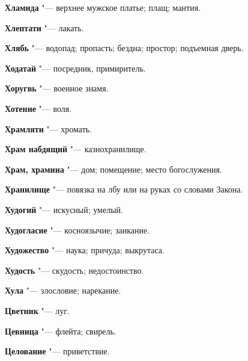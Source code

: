 \begin{mymulticols}{2}
\noindent\textbf{Хламида} "--- верхнее мужское платье; плащ; мантия. 




\noindent\textbf{Хлептати} "--- лакать. 




\noindent\textbf{Хлябь} "--- водопад; пропасть; бездна; простор; подъемная дверь. 




\noindent\textbf{Ходатай} "--- посредник, примиритель. 




\noindent\textbf{Хоругвь} "--- военное знамя. 




\noindent\textbf{Хотение} "--- воля. 




\noindent\textbf{Храмляти} "--- хромать. 




\noindent\textbf{Храм набдящий} "--- казнохранилище. 




\noindent\textbf{Храм, храмина} "--- дом; помещение; место богослужения. 




\noindent\textbf{Хранилище} "--- повязка на лбу или на руках со словами Закона. 




\noindent\textbf{Худогий} "--- искусный; умелый. 




\noindent\textbf{Худогласие} "--- косноязычие; заикание. 




\noindent\textbf{Художество} "--- наука; причуда; выкрутаса. 




\noindent\textbf{Худость} "--- скудость; недостоинство. 




\noindent\textbf{Хула} "--- злословие; нарекание. 









\noindent\textbf{Цветник} "--- луг. 




\noindent\textbf{Цевница} "--- флейта; свирель. 




\noindent\textbf{Целование} "--- приветствие. 





\end{mymulticols}
